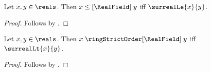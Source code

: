 \begin{proposition}\label{surreal_real_field_order}
    Let $x,y\in\reals$.
    Then $x\mathrel{\leq[\RealField]}y$ iff $\surrealLe{x}{y}$.
\end{proposition}
\begin{proof}
    Follows by
    .
\end{proof}

\begin{proposition}\label{surreal_real_field_strict_order}
    Let $x,y\in\reals$.
    Then
        $x\mathrel{\ringStrictOrder[\RealField]}y$ iff
        $\surrealLt{x}{y}$.
\end{proposition}
\begin{proof}
    Follows by
    .
\end{proof}

